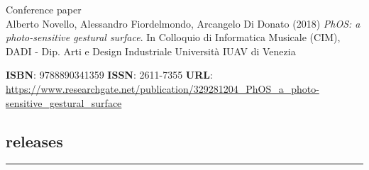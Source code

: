 \documentclass[7pt,a4paper]{article}
\begin{document}
\begin{mdframed}[
    backgroundcolor=white,
    linecolor=white,
    linewidth=0pt,
    innerleftmargin=6pt,
    innerrightmargin=6pt,
    innertopmargin=6pt,
    innerbottommargin=6pt,
    skipabove=0pt,
    skipbelow=0pt
]

\scriptsize Conference paper\\
\normalsize Alberto Novello, Alessandro Fiordelmondo, Arcangelo Di Donato
(2018) \textit{PhOS: a photo-sensitive gestural surface}.
In
Colloquio di Informatica Musicale (CIM), DADI - Dip. Arti e Design Industriale Università IUAV di Venezia

\vspace{0.1cm}
\scriptsize 
\scriptsize  \textbf{ISBN}: 9788890341359 
\scriptsize  \textbf{ISSN}: 2611-7355 
\scriptsize  \textbf{URL}: \href{https://www.researchgate.net/publication/329281204_PhOS_a_photo-sensitive_gestural_surface}{https://www.researchgate.net/publication/329281204\_PhOS\_a\_photo-sensitive\_gestural\_surface}
\vspace{0.15cm}
\end{mdframed}



\subsection*{releases}
\vspace{-0.5cm}
\rule{\textwidth}{0.4pt}
\vspace{0.1cm}
\end{document}
